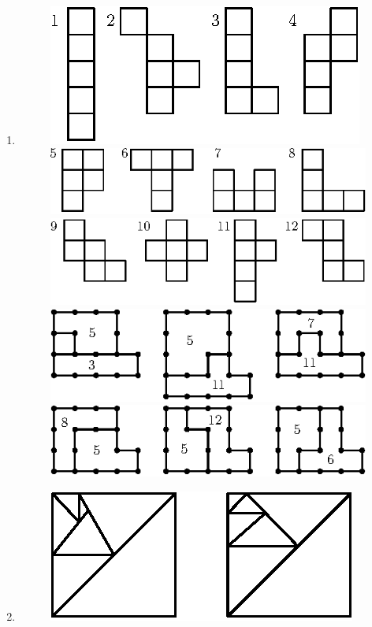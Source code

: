 \begin{enumerate}
\item 
\begin{figure}[H]
\centering
\includegraphics{images/chap11/ans15-1.eps}
\includegraphics{images/chap11/ans15-2.eps}
\includegraphics{images/chap11/ans15-3.eps}
\includegraphics{images/chap11/ans15-4.eps}
\includegraphics{images/chap11/ans15-5.eps}
\end{figure}

\item 
\begin{figure}[H]
\centering
\includegraphics{images/chap11/ans16.eps}
\end{figure}


\end{enumerate}
